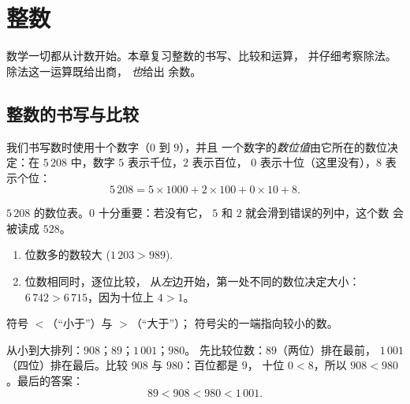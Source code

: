 \chapter{整数}\label{ch:g6:wholes}

数学一切都从计数开始。本章复习整数的书写、比较和运算，
并仔细考察除法。除法这一运算既给出商，
\emph{也}给出
余数。

\section{整数的书写与比较}

\begin{definition}[数位值]\label{def:g6:wholes:place}
我们书写数时使用十个数字（$0$ 到 $9$），并且
一个数字的\emph{数位值}由它所在的数位决定：在
$5\,208$ 中，数字 $5$ 表示千位，$2$ 表示百位，
$0$ 表示十位（这里没有），$8$ 表示个位：
\[
5\,208 = 5 \times 1000 + 2 \times 100 + 0 \times 10 + 8 .
\]
\end{definition}

\begin{omfigure}

{\small $5\,208$ 的数位表。$0$ 十分重要：若没有它，
$5$ 和 $2$ 就会滑到错误的列中，这个数
会被读成 $528$。}
\end{omfigure}

\begin{method}[比较两个整数]\label{met:g6:wholes:compare}
\begin{enumerate}
  \item 位数多的数较大
        ($1\,203 > 989$).
  \item 位数相同时，逐位比较，
        从\emph{左}边开始，第一处不同的数位决定大小：
        $6\,742 > 6\,715$，因为十位上 $4 > 1$。
\end{enumerate}
符号 $<$（“小于”）与 $>$（“大于”）；
符号尖的一端指向较小的数。
\end{method}

\begin{example}\label{ex:g6:wholes:order}
从小到大排列：$908$；$89$；$1\,001$；$980$。
先比较位数：$89$（两位）排在最前，
$1\,001$（四位）排在最后。比较 $908$ 与 $980$：百位都是 $9$，
十位 $0 < 8$，所以 $908 < 980$。最后的答案：
\[
89 < 908 < 980 < 1\,001 .
\]
\end{example}

